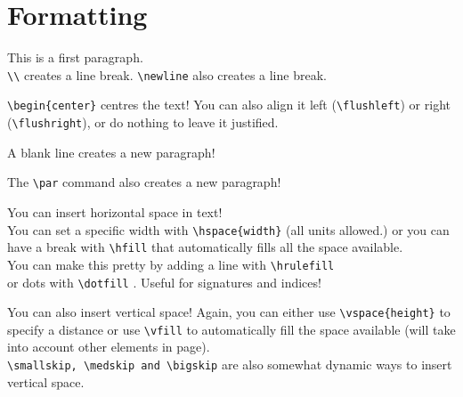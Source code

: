 \documentclass[12pt, letterpaper]{article} %
\begin{document}
\clearpage %

\section{Formatting}

\begin{abstract}
	\verb+\begin{abstract}+ formats an abstract environment.
\end{abstract}

This is a first paragraph.\\
\verb+\\+ creates a line break.\newline
\verb+\newline+ also creates a line break. %

\begin{center}
	\verb+\begin{center}+ centres the text! You can also align it left 
	(\verb+\flushleft+) or right (\verb+\flushright+), or do nothing 
	to leave it justified.
	
	A blank line creates a new paragraph!\par
	The \verb+\par+ command also creates a new paragraph!
\end{center}

You can insert horizontal space in text! \\
You can set a specific width with \verb+\hspace{width}+ \hspace{1cm} (all units 
allowed.)
or you can have a break with \verb+\hfill+ that automatically \hfill 
fills all the space available. \\ 
You can make this pretty by adding a line with \verb+\hrulefill+ \hrulefill \\
or dots with \verb+\dotfill+ \dotfill. Useful for signatures and indices!

You can also insert vertical space! 
Again, you can either use \verb+\vspace{height}+ to \vspace{5mm} \\
specify a distance or use \verb+\vfill+ to automatically \vfill fill the space 
available 
(will take into account other elements in page). \\  
\verb+\smallskip, \medskip and \bigskip+ are also 
somewhat dynamic ways to insert vertical space.
\end{document}

